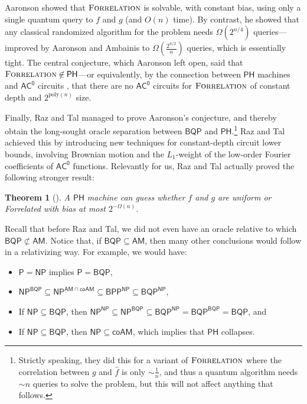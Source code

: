 \documentclass[10pt,a4paper]{article}
\newtheorem{theorem}{Theorem}
\newcommand{\poly}{\mathrm{poly}}
\newcommand{\Forrelation}{\normalfont\textsc{Forrelation}}
\begin{document}
Aaronson \cite{Aar10} showed that $\Forrelation$ is solvable, with constant bias, using only a single quantum query to $f$ and $g$ (and $O(n)$ time).  By contrast, he showed that any classical randomized algorithm for the problem needs $\Omega\left(2^{n/4}\right)$ queries---improved by Aaronson and Ambainis \cite{AA18} to $\Omega\left(\frac{2^{n/2}}{n}\right)$ queries, which is essentially tight.  The central conjecture, which Aaronson left open, said that $\Forrelation \not\in \mathsf{PH}$---or equivalently, by the connection between $\mathsf{PH}$ machines and $\mathsf{AC^0}$ circuits \cite{FSS84}, that there are no $\mathsf{AC^0}$ circuits for $\Forrelation$ of constant depth and $2^{\poly(n)}$ size.

Finally, Raz and Tal \cite{RT19} managed to prove Aaronson's conjecture, and thereby obtain the long-sought oracle separation between $\mathsf{BQP}$ and $\mathsf{PH}$.\footnote{Strictly speaking, they did this for a variant of $\Forrelation$ where the correlation between $g$ and $\hat{f}$ is only $\sim \frac{1}{n}$, and thus a quantum algorithm needs $\sim n$ queries to solve the problem, but this will not affect anything that follows.}  Raz and Tal achieved this by introducing new techniques for constant-depth circuit lower bounds, involving Brownian motion and the $L_1$-weight of the low-order
Fourier coefficients of $\mathsf{AC^0}$ functions.  Relevantly for us, Raz and Tal actually proved the following stronger result:

\begin{theorem}[\cite{RT19}]
\label{thm:raz-tal-informal-intro}
A $\mathsf{PH}$ machine can guess whether $f$ and $g$ are uniform or Forrelated with bias at most $2^{-\Omega(n)}$.
\end{theorem}

Recall that before Raz and Tal, we did not even have an oracle
relative to which $\mathsf{BQP} \not\subset \mathsf{AM}$.  Notice that, if $\mathsf{BQP} \subseteq \mathsf{AM}$, then many other conclusions would follow in a relativizing way.  For example, we would have:

\begin{itemize}
\item $\mathsf{P} = \mathsf{NP}$ implies $\mathsf{P} = \mathsf{BQP}$,
\item $\mathsf{NP}^\mathsf{BQP} \subseteq \mathsf{NP}^{\mathsf{AM} \cap \mathsf{coAM}} \subseteq \mathsf{BPP}^\mathsf{NP} \subseteq \mathsf{BQP}^\mathsf{NP}$,
\item If $\mathsf{NP} \subseteq \mathsf{BQP}$, then $\mathsf{NP}^\mathsf{NP} \subseteq \mathsf{NP}^\mathsf{BQP} \subseteq \mathsf{BQP}^\mathsf{NP} = \mathsf{BQP}^\mathsf{BQP} = \mathsf{BQP}$, and
\item If $\mathsf{NP} \subseteq \mathsf{BQP}$, then $\mathsf{NP} \subseteq \mathsf{coAM}$, which implies that $\mathsf{PH}$ collapses.
\end{itemize}
\end{document}
